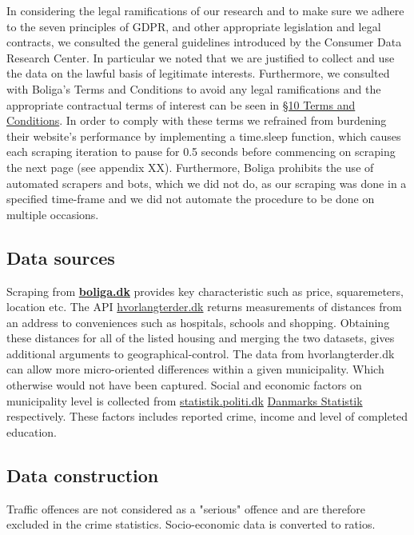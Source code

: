 \documentclass[12pt,a4paper]{article}
\begin{document}
In considering the legal ramifications of our research and to make sure we adhere to the seven principles of GDPR, and other appropriate legislation and legal contracts, we consulted the general guidelines introduced by the Consumer Data Research Center. In particular we noted that we are justified to collect and use the data on the lawful basis of legitimate interests. Furthermore, we consulted with Boliga's Terms and Conditions to avoid any legal ramifications and the appropriate contractual terms of interest can be seen in \href{https://www.boliga.dk/vilkaar-og-betingelser}{§10 Terms and Conditions}. In order to comply with these terms we refrained from burdening their website's performance by implementing a time.sleep function, which causes each scraping iteration to pause for 0.5 seconds before commencing on scraping the next page (see appendix XX). Furthermore, Boliga prohibits the use of automated scrapers and bots, which we did not do, as our scraping was done in a specified time-frame and we did not automate the procedure to be done on multiple occasions.
\subsection{Data sources}
Scraping from \textbf{\href{https://www.boliga.dk}{boliga.dk}} provides key characteristic such as price, squaremeters, location etc.   \newline
The API \href{https://www.hvorlangterder.dk}{hvorlangterder.dk} returns measurements of distances from an address to conveniences such as hospitals, schools and shopping. Obtaining these distances for all of the listed housing and merging the two datasets, gives additional arguments to geographical-control. The data from hvorlangterder.dk can allow more micro-oriented differences within a given municipality. Which otherwise would not have been captured.  
\newline 
Social and economic factors on municipality level is collected from \href{https://statistik.politi.dk/QvAJAXZfc/opendoc.htm?document=QlikApplication%2F2999_Public\%2FPublic_IndsatsResultater.qvw}{statistik.politi.dk}   \newline 
\href{https://www.dst.dk/da/Statistik/emner/befolkning-og-valg}{Danmarks Statistik} respectively. These factors includes reported crime, income and level of completed education. 

\subsection{Data construction}
Traffic offences are not considered as a "serious" offence and are therefore excluded in the crime statistics. 
Socio-economic data is converted to ratios.
 
\end{document}
